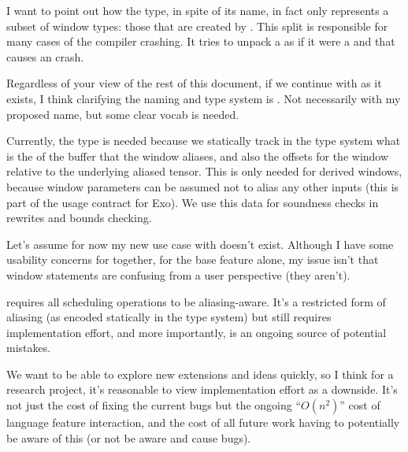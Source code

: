 I want to point out how the  type, in spite of its name, in fact only represents a subset of window types: those that are created by .
This split is responsible for many cases of the compiler crashing.
It tries to unpack a  as if it were a  and that causes an  crash.

\filbreak
Regardless of your view of the rest of this document, if we continue with  as it exists, I think clarifying the naming and type system is .
Not necessarily with my proposed name, but some clear vocab is needed.

\filbreak
Currently, the  type is needed because we statically track in the type system what is the  of the buffer that the window aliases, and also the offsets for the window relative to the underlying aliased tensor.
This is only needed for derived windows, because window parameters can be assumed not to alias any other inputs (this is part of the usage contract for Exo).
We use this data for soundness checks in rewrites and bounds checking.

\filbreak
{}

Let's assume for now my new use case with  doesn't exist.
Although I have some usability concerns for  together, for the base  feature alone, my issue isn't that window statements are confusing from a user perspective (they aren't).

\filbreak
{}  requires all scheduling operations to be aliasing-aware.
It's a restricted form of aliasing (as encoded statically in the type system) but still requires implementation effort, and more importantly, is an ongoing source of potential mistakes.

\filbreak
We want to be able to explore new extensions and ideas quickly, so I think for a research project, it's reasonable to view implementation effort as a downside.
It's not just the cost of fixing the current  bugs but the ongoing ``$O(n^2)$'' cost of language feature interaction, and the cost of all future work having to potentially be aware of this (or not be aware and cause bugs).

